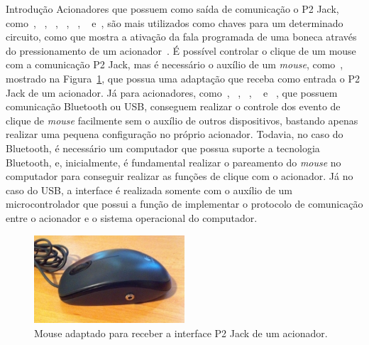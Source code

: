 \begin{chapter}{Introdução}
Acionadores que possuem como saída de comunicação o P2 Jack,
como~\cite{CandyCorn}, ~\cite{PalPad}, ~\cite{JellyBean}, ~\cite{Chin}, ~\cite{
MicroLight}, ~\cite{HoneyBee} e~\cite{StringSwitch}, são mais utilizados como
chaves para um determinado circuito, como que mostra a ativação da fala
programada de uma boneca através do pressionamento de um
acionador~\cite{ATswitchYT}. %
É possível controlar o clique de um mouse com a comunicação P2 Jack, mas é
necessário o auxílio de um \textit{mouse}, como~\cite{MouseJack}, mostrado na
Figura~\ref{fig:mouse}, que possua uma adaptação que receba como entrada o P2
Jack de um acionador. 
Já para acionadores, como~\cite{Blue2}, ~\cite{SavantElite2}, ~\cite{FootPedal},
~\cite{FootSwitch} e ~\cite{SipPuff}, que possuem comunicação Bluetooth ou USB,
conseguem realizar o controle dos evento de clique de \textit{mouse} facilmente
sem o auxílio de outros dispositivos, bastando apenas realizar uma pequena
configuração no próprio acionador. Todavia, no caso do Bluetooth, é necessário
um computador que possua suporte a tecnologia Bluetooth, e, inicialmente, é
fundamental realizar o pareamento do \textit{mouse} no computador para conseguir
realizar as funções de clique com o acionador. Já no caso do USB, a interface é 
realizada somente com o auxílio de um microcontrolador que possui a função de 
implementar o protocolo de comunicação entre o acionador e o sistema operacional
do computador.

\begin{figure}[!h]
	\centering
	\includegraphics[width=0.5\textwidth]{fig/mouse13}
	\caption{Mouse adaptado para receber a interface P2 Jack de um acionador.}
	\label{fig:mouse}
\end{figure}


\end{chapter}

